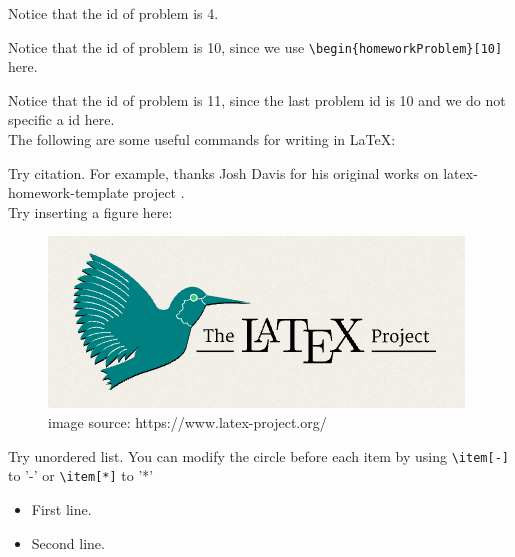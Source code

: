 \documentclass{homework}
\begin{document}
\pagebreak


%
%
\begin{homeworkProblem}
    Notice that the id of problem is 4.
\end{homeworkProblem}


%
%
\begin{homeworkProblem}[10]
    Notice that the id of problem is 10, since we use \verb|\begin{homeworkProblem}[10]| here.
\end{homeworkProblem}


%
%
\begin{homeworkProblem}

    Notice that the id of problem is 11, since the last problem id is 10 and we do not specific a id here. \\

    The following are some useful commands for writing in \LaTeX:

    \solution

    Try citation. For example, thanks Josh Davis for his original works on latex-homework-template project \cite{LatexHomeworkTemplate}. \\

    Try inserting a figure here: 

    \begin{figure}[h]
        \centering
        \includegraphics[scale=0.6]{figures/example.png}
        \caption{image source: https://www.latex-project.org/}
    \end{figure}

    Try unordered list. You can modify the circle before each item by using \verb|\item[-]| to '-' or \verb|\item[*]| to '*'
    
    \begin{itemize}
        \item First line.
        \item Second line.
    \end{itemize}


\end{homeworkProblem}
\end{document}
